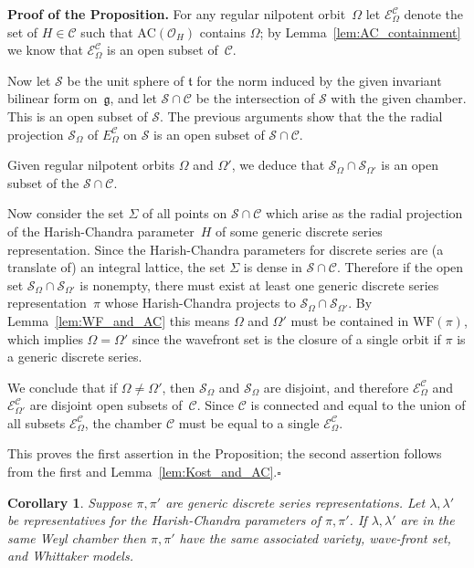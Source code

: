 \documentclass[10pt,leqno]{article}
\newtheorem{corollary}[equation]{Corollary}
\numberwithin{equation}{section}
\newcommand{\qed}{\hfill $\square$ \medskip}
\newenvironment{proof}[1][Proof]{\noindent\textbf{#1.} }{\qed}
\renewcommand{\t}{\mathfrak t}
\newcommand{\g}{\mathfrak g}
\newcommand{\WF}{\mathrm{WF}}
\newcommand{\AC}{\mathrm{AC}}
\newcommand{\ECom}{\mathcal{E}^{\mathcal{C}}_\Omega}
\begin{document}
\begin{proof}[Proof of the  Proposition]
For any regular nilpotent orbit~$\Omega$ let $\ECom$  denote the set of $H \in \mathcal{C}$ such that $\AC(\mathcal{O}_H)$ contains $\Omega$; by Lemma~\ref{lem:AC_containment}  we know that   $\ECom$ is an open subset of~$\mathcal{C}$. 

Now let $\mathcal{S}$ be the unit sphere of $\t$ for the norm induced by the given invariant bilinear form on~$\g$, and let $\mathcal{S} \cap \mathcal{C}$ be the intersection of $\mathcal{S}$ with the given chamber. This is an open subset of $\mathcal{S}$. The previous arguments show that the the radial projection $\mathcal{S}_{\Omega}$ of  $E^{\mathcal{C}}_\Omega$ on $\mathcal{S}$ is an open subset of $\mathcal{S} \cap \mathcal{C}$. 

Given regular nilpotent orbits $\Omega$ and $\Omega'$, we deduce that $\mathcal{S}_\Omega \cap \mathcal{S}_{\Omega'}$ is an open subset of the $\mathcal{S} \cap \mathcal{C}$.

Now consider the set $\Sigma$ of all points on $\mathcal{S} \cap \mathcal{C}$ which arise as the radial projection of the Harish-Chandra parameter~$H$ of some generic discrete series representation. Since the Harish-Chandra parameters for discrete series are (a translate of) an integral lattice, the set $\Sigma$ is dense in $\mathcal{S} \cap \mathcal{C}$. Therefore if the open set $\mathcal{S}_\Omega \cap \mathcal{S}_{\Omega'}$ is nonempty, there must exist at least one generic discrete series representation~$\pi$ whose Harish-Chandra projects to $\mathcal{S}_\Omega \cap \mathcal{S}_{\Omega'}$. By Lemma~\ref{lem:WF_and_AC} this means $\Omega$ and $\Omega'$ must be contained in $\WF(\pi)$, which implies $\Omega = \Omega'$ since the wavefront set is the closure of a single orbit if $\pi$ is a generic discrete series. 

We conclude that if $\Omega \neq \Omega'$, then $\mathcal{S}_\Omega$ and $\mathcal{S}_\Omega$ are disjoint, and therefore $\ECom$ and $\mathcal{E}^{\mathcal{C}}_{\Omega'}$ are disjoint open subsets of~$\mathcal{C}$. Since $\mathcal{C}$ is connected and equal to the union of all subsets $\mathcal{E}^{\mathcal{C}}_{\Omega}$, the chamber $\mathcal{C}$ must be equal to a single $\ECom$.

This proves the first assertion in the Proposition; the second assertion follows from the first and Lemma~\ref{lem:Kost_and_AC}.\end{proof}

\begin{corollary}
\label{c:same}
Suppose $\pi,\pi'$ are generic discrete series representations. Let  $\lambda,\lambda'$ be representatives
for the Harish-Chandra parameters of $\pi,\pi'$. If 
$\lambda,\lambda'$ are in the same  Weyl chamber then
$\pi,\pi'$ have the same associated variety, wave-front set, and Whittaker models.
\end{corollary}
\end{document}
